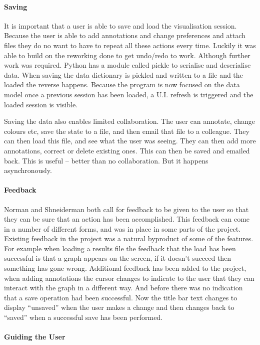 \paragraph{Saving}

It is important that a user is able to save and load the visualisation session.  Because the user is able to add annotations and change preferences and attach files they do no want to have to repeat all these actions every time.  Luckily it was able to build on the reworking done to get undo/redo to work.  Although further work was required. Python has a module called pickle to serialise and deserialise data.  When saving the data dictionary is pickled and written to a file and the loaded the reverse happens.  Because the program is now focused on the data model once a previous session has been loaded, a U.I. refresh is triggered and the loaded session is visible.

Saving the data also enables limited collaboration.  The user can annotate, change colours etc, save the state to a file, and then email that file to a colleague.  They can then load this file, and see what the user was seeing.  They can then add more annotations, correct or delete existing ones.  This can then be saved and emailed back.  This is useful -- better than no collaboration.  But it happens asynchronously.

\paragraph{Feedback}
Norman and Shneiderman both call for feedback to be given to the user so that they can be sure that an action has been accomplished.  This feedback can come in a number of different forms, and was in place in some parts of the project.
Existing feedback in the project was a natural byproduct of some of the features.  For example when loading a results file the feedback that the load has been successful is that a graph appears on the screen, if it doesn't succeed then something has gone wrong.  Additional feedback has been added to the project, when adding annotations the cursor changes to indicate to the user that they can interact with the graph in a different way.  And before there was no indication that a save operation had been successful.  Now the title bar text changes to display ``unsaved'' when the user makes a change and then changes back to ``saved'' when a successful save has been performed.

\paragraph{Guiding the User}

